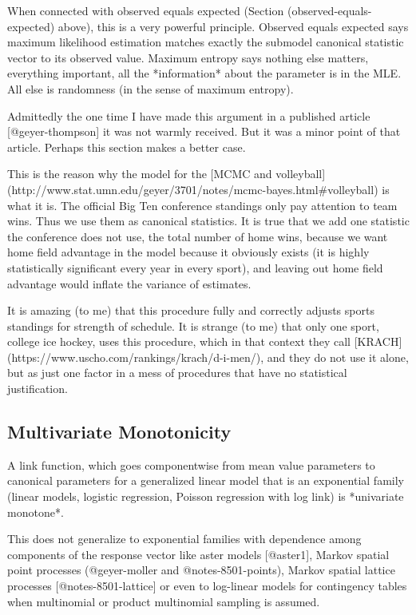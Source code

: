 \documentclass[11pt]{article}
\begin{document}
When connected with observed equals expected
(Section \@ref(observed-equals-expected) above), this is a very powerful
principle.  Observed equals expected says maximum likelihood estimation
matches exactly the submodel canonical statistic vector to its observed value.
Maximum entropy says nothing else matters, everything important, all the
*information* about the parameter is in the MLE.  All else is randomness
(in the sense of maximum entropy).

Admittedly the one time I have made this argument in a published article
[@geyer-thompson] it was not warmly received.
But it was a minor point of that article.  Perhaps this section makes
a better case.

This is the reason why the model for the
[MCMC and volleyball](http://www.stat.umn.edu/geyer/3701/notes/mcmc-bayes.html#volleyball) is what it is.
The official Big Ten conference standings only pay attention to team wins.
Thus we use them as canonical statistics.
It is true that we add one statistic the conference does not use,
the total number of home wins, because we want home field
advantage in the model because it obviously exists (it is highly statistically
significant every year in every sport), and leaving out home field advantage
would inflate the variance of estimates.

It is amazing (to me) that this procedure fully and correctly adjusts
sports standings for strength of schedule.  It is strange (to me) that only
one sport, college ice hockey, uses this procedure, which in that context they
call [KRACH](https://www.uscho.com/rankings/krach/d-i-men/), and they do
not use it alone, but as just one factor in a mess of procedures that have
no statistical justification.

\subsection{Multivariate Monotonicity} \label{sec:multivariate-monotonicity}

A link function,
which goes componentwise from mean value parameters
to canonical parameters for a generalized linear model
that is an exponential family (linear models, logistic regression,
Poisson regression with log link) is *univariate monotone*.

This does not generalize to exponential families with dependence among
components of the response vector like aster models [@aster1],
Markov spatial point processes
(@geyer-moller and @notes-8501-points),
Markov spatial lattice processes
[@notes-8501-lattice] or even to log-linear models for contingency
tables when multinomial or product multinomial sampling is assumed.
\end{document}
